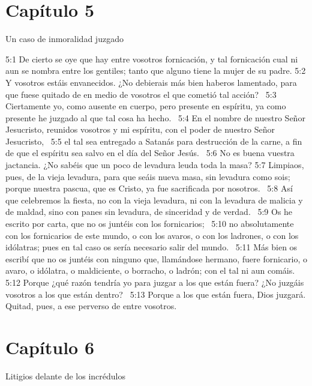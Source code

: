 \section*{Capítulo 5}
Un caso de inmoralidad juzgado  

5:1 De cierto se oye que hay entre vosotros fornicación, y tal fornicación cual ni aun se nombra entre los gentiles; tanto que alguno tiene la mujer de su padre. 
5:2 Y vosotros estáis envanecidos. ¿No debierais más bien haberos lamentado, para que fuese quitado de en medio de vosotros el que cometió tal acción?  
5:3 Ciertamente yo, como ausente en cuerpo, pero presente en espíritu, ya como presente he juzgado al que tal cosa ha hecho.  
5:4 En el nombre de nuestro Señor Jesucristo, reunidos vosotros y mi espíritu, con el poder de nuestro Señor Jesucristo,  
5:5 el tal sea entregado a Satanás para destrucción de la carne, a fin de que el espíritu sea salvo en el día del Señor Jesús.  
5:6 No es buena vuestra jactancia. ¿No sabéis que un poco de levadura leuda toda la masa? 
5:7 Limpiaos, pues, de la vieja levadura, para que seáis nueva masa, sin levadura como sois; porque nuestra pascua, que es Cristo, ya fue sacrificada por nosotros.  
5:8 Así que celebremos la fiesta, no con la vieja levadura, ni con la levadura de malicia y de maldad, sino con panes sin levadura, de sinceridad y de verdad.  
5:9 Os he escrito por carta, que no os juntéis con los fornicarios;  
5:10 no absolutamente con los fornicarios de este mundo, o con los avaros, o con los ladrones, o con los idólatras; pues en tal caso os sería necesario salir del mundo.  
5:11 Más bien os escribí que no os juntéis con ninguno que, llamándose hermano, fuere fornicario, o avaro, o idólatra, o maldiciente, o borracho, o ladrón; con el tal ni aun comáis.  
5:12 Porque ¿qué razón tendría yo para juzgar a los que están fuera? ¿No juzgáis vosotros a los que están dentro?  
5:13 Porque a los que están fuera, Dios juzgará. Quitad, pues, a ese perverso de entre vosotros.  
\section*{Capítulo 6}
Litigios delante de los incrédulos  

